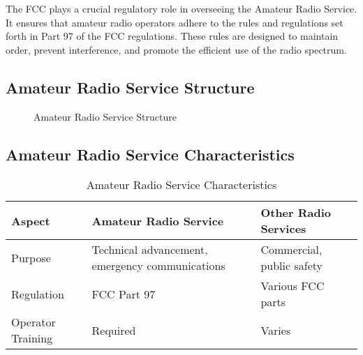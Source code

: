 The FCC plays a crucial regulatory role in overseeing the Amateur Radio Service. It ensures that amateur radio operators adhere to the rules and regulations set forth in Part 97 of the FCC regulations. These rules are designed to maintain order, prevent interference, and promote the efficient use of the radio spectrum.

\subsection*{Amateur Radio Service Structure}
\begin{figure}[h]
    \centering
    \caption{Amateur Radio Service Structure}
    \label{fig:amateur_structure}
\end{figure}

\subsection*{Amateur Radio Service Characteristics}
\begin{table}[h]
    \centering
    \begin{tabular}{|l|l|l|}
        \hline
        \textbf{Aspect} & \textbf{Amateur Radio Service} & \textbf{Other Radio Services} \\
        \hline
        Purpose & Technical advancement, emergency communications & Commercial, public safety \\
        Regulation & FCC Part 97 & Various FCC parts \\
        Operator Training & Required & Varies \\
        \hline
    \end{tabular}
    \caption{Amateur Radio Service Characteristics}
    \label{tab:service_comparison}
\end{table}


